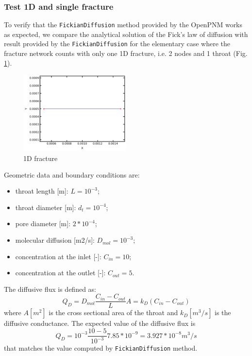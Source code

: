 \documentclass{article}
\begin{document}
\subsubsection{Test 1D and single fracture}
To  verify that the \texttt{FickianDiffusion} method provided by the OpenPNM works as expected, we compare the analytical solution of the Fick's law of diffusion with result provided by the \texttt{FickianDiffusion} for the elementary case where the fracture network counts with only one 1D fracture, i.e. 2 nodes and 1 throat (Fig. \ref{fig:OneFracture}).
\begin{figure}[h]
    \centering
    \includegraphics[width=0.5\textwidth]{images/fromOpenPNM/oneFracture.png}
    \caption{1D fracture}
    \label{fig:OneFracture}
\end{figure}
Geometric data and boundary conditions are:
\begin{itemize}
    \item throat length [m]: $L = 10^{-3}$;
    \item throat diameter [m]: $d_t = 10^{-4}$;
    \item pore diameter [m]: $2*10^{-4}$;
    \item molecular diffusion [m2/s]: $D_{mol} = 10^{-3}$;
    \item concentration at the inlet [-]: $C_{in} = 10$;
    \item concentration at the outlet [-]: $C_{out} = 5$.
\end{itemize}
The diffusive flux is defined as:
\begin{equation}
    Q_D = D_{mol} \frac{C_{in}-C_{out}}{L} A = k_D (C_{in}-C_{out})
\end{equation}
where $A [m^2]$ is the cross sectional area of the throat and $k_D [m^3/s]$ is the diffusive conductance.
The expected value of the diffusive flux is
\begin{equation}
    Q_D = 10^{-3} \frac{10-5}{10^{-3}} 7.85*10^{-9} = 3.927*10^{-8} m^3/s
\end{equation}
that matches the value computed by \texttt{FickianDiffusion} method.
\end{document}
